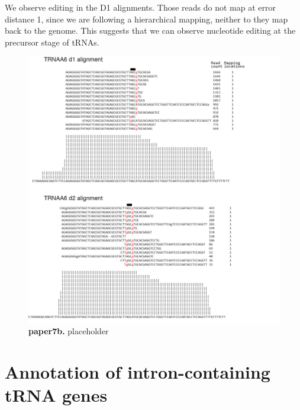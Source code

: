 \documentclass[12pt]{rockefeller}
\begin{document}
We observe editing in the D1 alignments. Those reads do not map at error distance 1, since we are following a hierarchical mapping, neither to they map back to the genome. This suggests that we can observe nucleotide editing at the precursor stage of tRNAs. 

\begin{figure}[!ht]%
\centering
\includegraphics[width = 5in]{paper7b.png}%
\caption[paper7b]
{\textbf{paper7b.}
placeholder}
\centering
\label{paper7b}%
\end{figure}

\section{Annotation of intron-containing tRNA genes} \label{introns}
\end{document}
